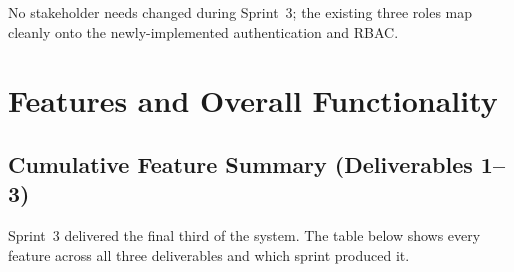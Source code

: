 \documentclass[12pt, a4paper]{article}
\begin{document}
\noindent No stakeholder needs changed during Sprint~3; the existing three
roles map cleanly onto the newly-implemented authentication and RBAC.

\section{Features and Overall Functionality}

\subsection{Cumulative Feature Summary (Deliverables 1--3)}

Sprint~3 delivered the final third of the system. The table below shows every
feature across all three deliverables and which sprint produced it.
\end{document}
